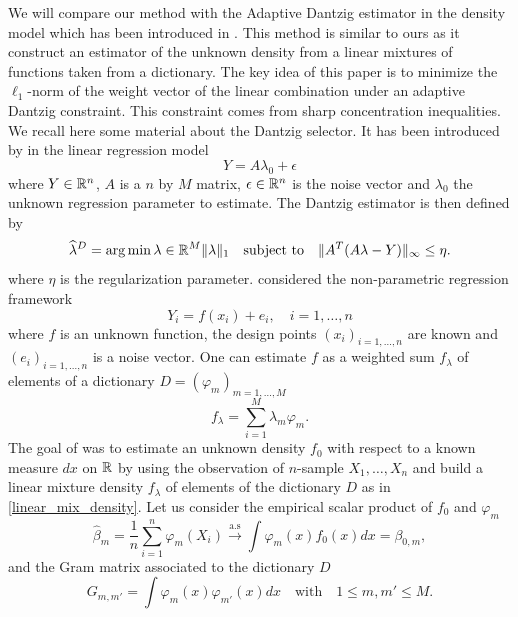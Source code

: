 We will compare our method with the Adaptive Dantzig estimator in the density model which has been introduced in \cite{Bertin}. This method is similar to ours as it construct an estimator of the unknown density from a linear mixtures of functions taken from a dictionary. The key idea of this paper is to minimize the $\ell_1$-norm of the weight vector of the linear combination under an adaptive Dantzig constraint. This constraint comes from sharp concentration inequalities. We recall here some material about the Dantzig selector. It has been introduced by \cite{candes2007} in the linear regression model
\begin{equation}
	Y = A\lambda_0 + \epsilon
\end{equation}
where $Y\in {\mathbb R}^n$, $A$ is a $n$ by $M$ matrix, $\epsilon \in {\mathbb R}^n$ is the noise vector and $\lambda_0$ the unknown regression parameter to estimate. The Dantzig estimator is then defined by
\begin{equation}
	\widehat\lambda^D = \operatorname*{arg\,min}{\lambda \in {\mathbb R}^M} \|\lambda \|_1 \quad \text{subject to} \quad \| A^T(A\lambda-Y)\|_{\infty} \leq \eta.
\end{equation}
where $\eta$ is the regularization parameter. \cite{bickel2009} considered the non-parametric regression framework
\begin{equation}
		Y_i = f(x_i) + e_i, \quad i=1,\dots,n
\end{equation}
where $f$ is an unknown function, the design points $(x_i)_{i=1,\dots,n}$ are known and $(e_i)_{i=1,\dots,n}$ is a noise vector. One can estimate $f$ as a weighted sum $f_{\lambda}$ of elements of a dictionary $D=(\varphi_m)_{m=1,\dots,M}$
\begin{equation}
\label{linear_mix_density}
	f_{\lambda} = \sum_{i=1}^M\lambda_m\varphi_m.
\end{equation}
 The goal of \cite{Bertin} was to estimate an unknown density $f_0$ with respect to a known measure $dx$ on ${\mathbb R}$ by using the observation of $n$-sample $X_1,\dots,X_n$ and build a linear mixture density $f_{\lambda}$ of elements of the dictionary $D$ as in \cref{linear_mix_density}. Let us consider the empirical scalar product of $f_0$ and $\varphi_m$
\begin{equation}
    \hat\beta_m = \frac{1}{n}\sum_{i=1}^n\varphi_m(X_i) \xrightarrow{\text{a.s}} \int \varphi_m(x)f_0(x)dx=\beta_{0,m},
\end{equation}
and the Gram matrix associated to the dictionary $D$
\begin{equation}
    G_{m,m'}=\int\varphi_m(x)\varphi_{m'}(x)dx \quad \text{with}\quad 1\leq m,m' \leq M.
\end{equation}
